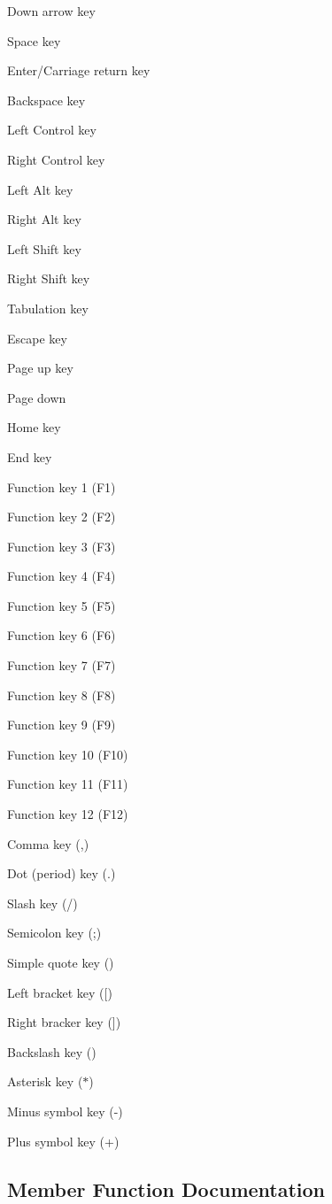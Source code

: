 Down arrow key

Space key

Enter/\+Carriage return key

Backspace key

Left Control key

Right Control key

Left Alt key

Right Alt key

Left Shift key

Right Shift key

Tabulation key

Escape key

Page up key

Page down

Home key

End key

Function key 1 (F1)

Function key 2 (F2)

Function key 3 (F3)

Function key 4 (F4)

Function key 5 (F5)

Function key 6 (F6)

Function key 7 (F7)

Function key 8 (F8)

Function key 9 (F9)

Function key 10 (F10)

Function key 11 (F11)

Function key 12 (F12)

Comma key (,)

Dot (period) key (.)

Slash key (/)

Semicolon key (;)

Simple quote key (\textquotesingle{})

Left bracket key (\mbox{[})

Right bracker key (\mbox{]})

Backslash key ()

Asterisk key ($\ast$)

Minus symbol key (-\/)

Plus symbol key (+) 

\subsection{Member Function Documentation}
\mbox{\label{classarcade_1_1_gfx_s_f_m_l_a12711203981dc2b9ce60df96d0aa6f55}} 
